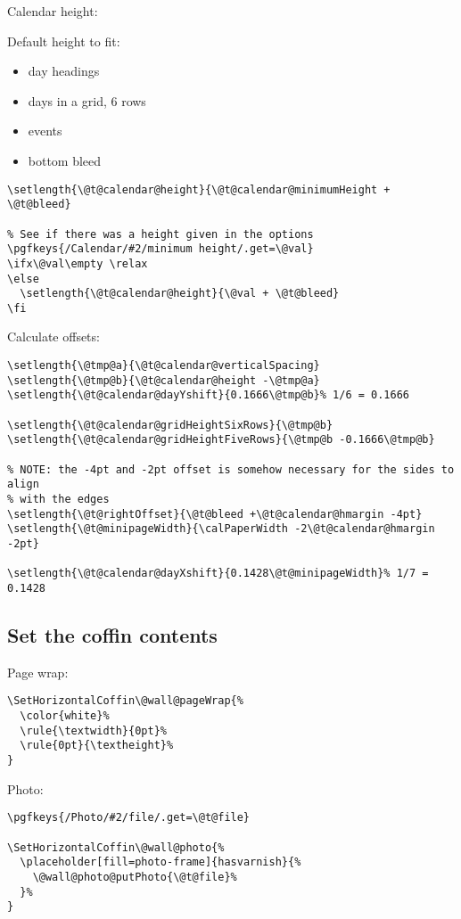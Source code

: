 \documentclass[11pt,oneside]{memoir-article}
\begin{document}
Calendar height:

Default height to fit:

\begin{itemize}
\item day headings
\item days in a grid, 6 rows
\item events
\item bottom bleed
\end{itemize}

\begin{verbatim}
\setlength{\@t@calendar@height}{\@t@calendar@minimumHeight + \@t@bleed}

% See if there was a height given in the options
\pgfkeys{/Calendar/#2/minimum height/.get=\@val}
\ifx\@val\empty \relax
\else
  \setlength{\@t@calendar@height}{\@val + \@t@bleed}
\fi
\end{verbatim}

Calculate offsets:

\begin{verbatim}
\setlength{\@tmp@a}{\@t@calendar@verticalSpacing}
\setlength{\@tmp@b}{\@t@calendar@height -\@tmp@a}
\setlength{\@t@calendar@dayYshift}{0.1666\@tmp@b}% 1/6 = 0.1666

\setlength{\@t@calendar@gridHeightSixRows}{\@tmp@b}
\setlength{\@t@calendar@gridHeightFiveRows}{\@tmp@b -0.1666\@tmp@b}

% NOTE: the -4pt and -2pt offset is somehow necessary for the sides to align
% with the edges
\setlength{\@t@rightOffset}{\@t@bleed +\@t@calendar@hmargin -4pt}
\setlength{\@t@minipageWidth}{\calPaperWidth -2\@t@calendar@hmargin -2pt}

\setlength{\@t@calendar@dayXshift}{0.1428\@t@minipageWidth}% 1/7 = 0.1428
\end{verbatim}

\subsection{Set the coffin contents}
\label{sec:orga9c5466}

Page wrap:

\begin{verbatim}
\SetHorizontalCoffin\@wall@pageWrap{%
  \color{white}%
  \rule{\textwidth}{0pt}%
  \rule{0pt}{\textheight}%
}
\end{verbatim}

Photo:

\begin{verbatim}
\pgfkeys{/Photo/#2/file/.get=\@t@file}

\SetHorizontalCoffin\@wall@photo{%
  \placeholder[fill=photo-frame]{hasvarnish}{%
    \@wall@photo@putPhoto{\@t@file}%
  }%
}
\end{verbatim}
\end{document}
